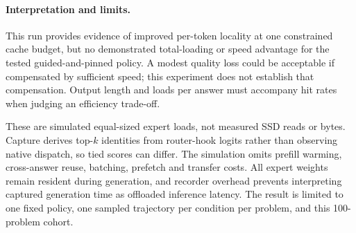 \paragraph{Interpretation and limits.}
This run provides evidence of improved per-token locality at one
constrained cache budget, but no demonstrated total-loading or speed
advantage for the tested guided-and-pinned policy. A modest quality loss
could be acceptable if compensated by sufficient speed; this experiment
does not establish that compensation. Output length and loads per answer
must accompany hit rates when judging an efficiency trade-off.

These are simulated equal-sized expert loads, not measured SSD reads or
bytes. Capture derives top-$k$ identities from router-hook logits rather
than observing native dispatch, so tied scores can differ. The simulation
omits prefill warming, cross-answer reuse, batching, prefetch and transfer
costs. All expert weights remain resident during generation, and recorder
overhead prevents interpreting captured generation time as offloaded
inference latency. The result is limited to one fixed policy, one sampled
trajectory per condition per problem, and this 100-problem cohort.
